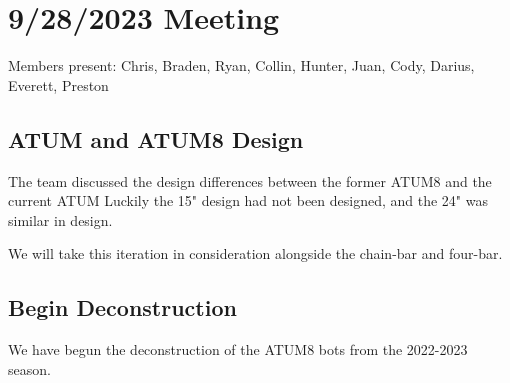 \section{9/28/2023 Meeting}

Members present: Chris, Braden, Ryan, Collin, Hunter, Juan, Cody, Darius,
Everett, Preston

\subsection{ATUM and ATUM8 Design}
The team discussed the design differences between the former ATUM8 and the
current ATUM Luckily the 15" design had not been designed, and the 24" was
similar in design.

We will take this iteration in consideration alongside the chain-bar and
four-bar.

\subsection{Begin Deconstruction}
We have begun the deconstruction of the ATUM8 bots from the 2022-2023 season.